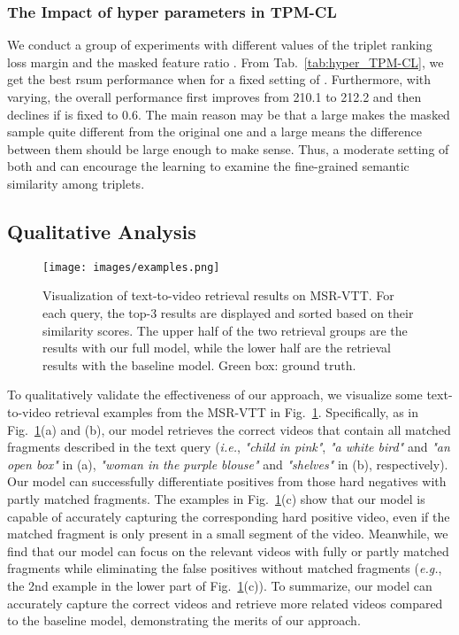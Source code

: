 \documentclass[sigconf]{acmart}
\begin{document}
\subsubsection{The Impact of hyper parameters in TPM-CL}
We conduct a group of experiments with different values of the triplet ranking loss margin  and the masked feature ratio . From Tab.~\ref{tab:hyper_TPM-CL}, we get the best rsum performance when  for a fixed setting of .  
Furthermore, with  varying, the overall performance first improves from 210.1 to 212.2 and then declines if  is fixed to 0.6. 
The main reason may be that a large  makes the masked sample quite different from the original one and a large  means the difference between them should be large enough to make sense. 
Thus, a moderate setting of both  and  can encourage the learning to examine the fine-grained semantic similarity among triplets.






\subsection{Qualitative Analysis}

\begin{figure}[] \centering
\texttt{[image: images/examples.png]}
  \caption{Visualization of text-to-video retrieval results on MSR-VTT. For each query, the top-3 results are displayed and sorted based on their similarity scores. The upper half of the two retrieval groups are the results with our full model, while the lower half are the retrieval results with the baseline model. Green box: ground truth.}
  \label{fig:examples}
  \vspace{-0.2cm}
\end{figure}

To qualitatively validate the effectiveness of our approach, we visualize some text-to-video retrieval examples from the MSR-VTT in Fig.~\ref{fig:examples}. Specifically, as in Fig.~\ref{fig:examples}(a) and (b), our model retrieves the correct videos that contain all matched fragments described in the text query (\emph{i.e.}, \textit{"child in pink"}, \textit{"a white bird"} and \textit{"an open box"} in (a), \textit{"woman in the purple blouse"} and \textit{"shelves"} in (b), respectively). 
Our model can successfully differentiate positives from those hard negatives with partly matched fragments. 
The examples in Fig.~\ref{fig:examples}(c) show that our model is capable of accurately capturing the corresponding hard positive video, even if the matched fragment is only present in a small segment of the video.
Meanwhile, we find that our model can focus on the relevant videos with fully or partly matched fragments while eliminating the false positives without matched fragments (\textit{e.g.}, the 2nd example in the lower part of Fig.~\ref{fig:examples}(c)).
To summarize, our model can accurately capture the correct videos and retrieve more related videos compared to the baseline model, demonstrating the merits of our approach.
\end{document}

